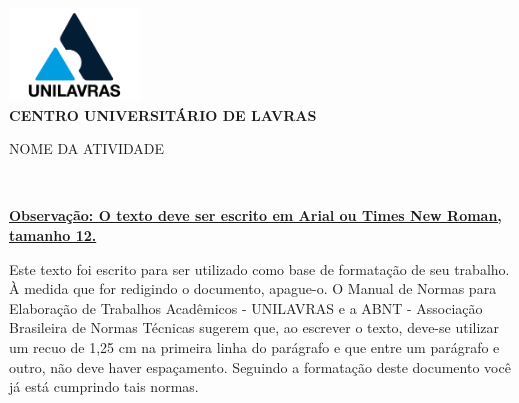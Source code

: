\documentclass[12pt,article,oneside,a4paper]{abntex2}
\begin{document}
{\centering
\includegraphics[height=2.46cm, width=3.47cm]{image1.png}\\[1em] 
{\selectfont\MakeUppercase{\textbf{Centro Universitário de Lavras}}\\[0.1em]}

{\selectfont\MakeUppercase{Nome da Atividade}\\[0.1em]}
}
{\flushright
{\selectfont{Nome do aluno}}\\[1em]
}

\setlength{\parindent}{1.25cm} %
\setlength{\parskip}{0pt} %


%
%
%

\begin{center}
\textbf{\uline{Observação: O texto deve ser escrito em Arial ou Times New Roman, tamanho 12.\newline}}
\end{center}



Este texto foi escrito para ser utilizado como base de formatação de seu trabalho. À medida que for redigindo o documento, apague-o.
O Manual de Normas para Elaboração de Trabalhos Acadêmicos - UNILAVRAS e a ABNT - Associação Brasileira de Normas Técnicas sugerem que, ao escrever o texto, deve-se utilizar um recuo de 1,25 cm na primeira linha do parágrafo e que entre um parágrafo e outro, não deve haver espaçamento. Seguindo a formatação deste documento você já está cumprindo tais normas.
\end{document}
